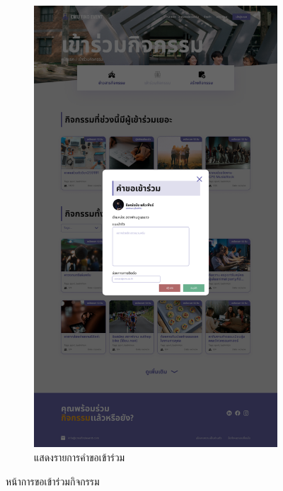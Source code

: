 \begin{figure}[h]
\begin{subfigure}[b]{0.3\linewidth}
    \includegraphics[width=\linewidth]{image/Figma-design/New-Event-join-noti.png}
    \caption{แสดงรายการคำขอเข้าร่วม}
  \end{subfigure}
  \caption{หน้าการขอเข้าร่วมกิจกรรม}
  \label{fig:event-join}
\end{figure}

